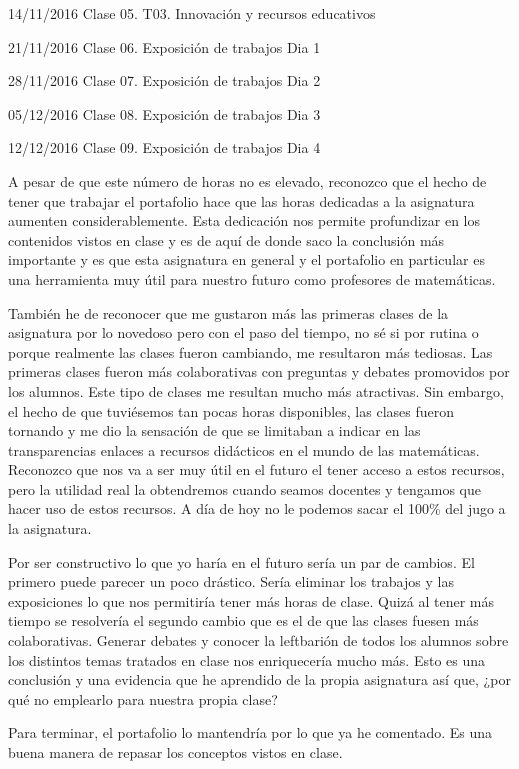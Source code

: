 \begin{leftbar}{\guscolor}
14/11/2016 Clase 05. T03. Innovación y recursos educativos

21/11/2016 Clase 06. Exposición de trabajos Dia 1

28/11/2016 Clase 07. Exposición de trabajos Dia 2

05/12/2016 Clase 08. Exposición de trabajos Dia 3

12/12/2016 Clase 09. Exposición de trabajos Dia 4

A pesar de que este número de horas no es elevado, reconozco que el hecho de tener que trabajar el portafolio hace que las horas dedicadas a la asignatura aumenten considerablemente. Esta dedicación nos permite profundizar en los contenidos vistos en clase y es de aquí de donde saco la conclusión más importante y es que esta asignatura en general y el portafolio en particular es una herramienta muy útil para nuestro futuro como profesores de matemáticas.

También he de reconocer que me gustaron más las primeras clases de la asignatura por lo novedoso pero con el paso del tiempo, no sé si por rutina o porque realmente las clases fueron cambiando, me resultaron más tediosas. Las primeras clases fueron más colaborativas con preguntas y debates promovidos por los alumnos. Este tipo de clases me resultan mucho más atractivas. Sin embargo, el hecho de que tuviésemos tan pocas horas disponibles, las clases fueron tornando y me dio la sensación de que se limitaban a indicar en las transparencias enlaces a recursos didácticos en el mundo de las matemáticas. Reconozco que nos va a ser muy útil en el futuro el tener acceso a estos recursos, pero la utilidad real la obtendremos cuando seamos docentes y tengamos que hacer uso de estos recursos. A día de hoy no le podemos sacar el 100\% del jugo a la asignatura.

Por ser constructivo lo que yo haría en el futuro sería un par de cambios. El primero puede parecer un poco drástico. Sería eliminar los trabajos y las exposiciones lo que nos permitiría tener más horas de clase. Quizá al tener más tiempo se resolvería el segundo cambio que es el de que las clases fuesen más colaborativas. Generar debates y conocer la leftbarión de todos los alumnos sobre los distintos temas tratados en clase nos enriquecería mucho más. Esto es una conclusión y una evidencia que he aprendido de la propia asignatura así que, ¿por qué no emplearlo para nuestra propia clase?

Para terminar, el portafolio lo mantendría por lo que ya he comentado. Es una buena manera de repasar los conceptos vistos en clase.


\end{leftbar}
